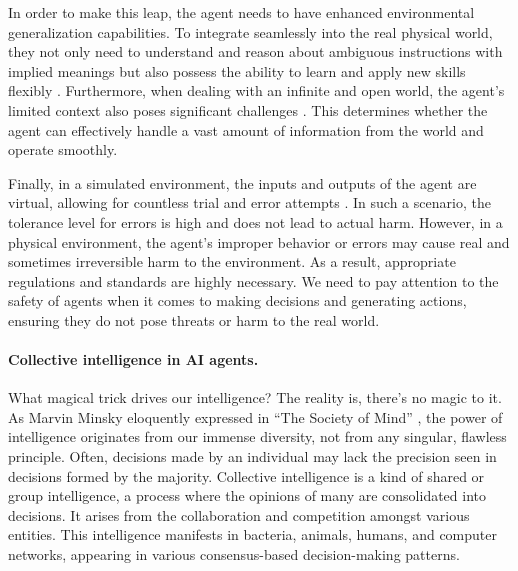 In order to make this leap, the agent needs to have enhanced environmental generalization capabilities. To integrate seamlessly into the real physical world, they not only need to understand and reason about ambiguous instructions with implied meanings \cite{DBLP:conf/acl/LinFKD22} but also possess the ability to learn and apply new skills flexibly \cite{DBLP:journals/corr/abs-2305-16291, DBLP:journals/corr/abs-2305-12487}. Furthermore, when dealing with an infinite and open world, the agent's limited context also poses significant challenges \cite{DBLP:journals/corr/abs-2305-01625, DBLP:conf/icml/ChowdhuryC23a}. This determines whether the agent can effectively handle a vast amount of information from the world and operate smoothly. 

Finally, in a simulated environment, the inputs and outputs of the agent are virtual, allowing for countless trial and error attempts \cite{DBLP:journals/corr/abs-2012-02757}. In such a scenario, the tolerance level for errors is high and does not lead to actual harm. However, in a physical environment, the agent's improper behavior or errors may cause real and sometimes irreversible harm to the environment. As a result, appropriate regulations and standards are highly necessary. We need to pay attention to the safety of agents when it comes to making decisions and generating actions, ensuring they do not pose threats or harm to the real world.

\paragraph{Collective intelligence in AI agents.}
What magical trick drives our intelligence? The reality is, there's no magic to it. As Marvin Minsky eloquently expressed in ``The Society of Mind'' \cite{minsky1988society}, the power of intelligence originates from our immense diversity, not from any singular, flawless principle. Often, decisions made by an individual may lack the precision seen in decisions formed by the majority. Collective intelligence is a kind of shared or group intelligence, a process where the opinions of many are consolidated into decisions. It arises from the collaboration and competition amongst various entities. This intelligence manifests in bacteria, animals, humans, and computer networks, appearing in various consensus-based decision-making patterns.


